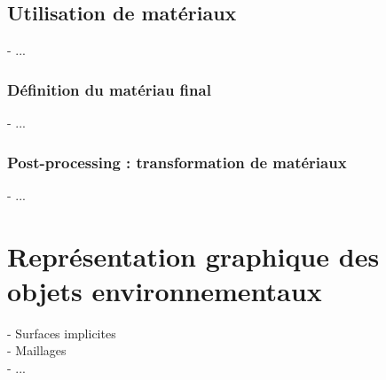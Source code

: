\subsection{Utilisation de matériaux}
- ...

\subsubsection{Définition du matériau final}
- ...

\subsubsection{Post-processing : transformation de matériaux}
- ...



\section{Représentation graphique des objets environnementaux}
\label{sec:volumic-modeling_graphic-representation-env-objects}
- Surfaces implicites \\
- Maillages \\
- ...
